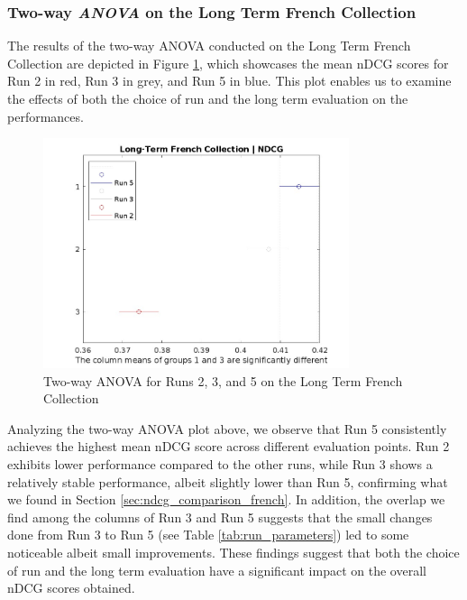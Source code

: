 \newpage
\enlargethispage{8\baselineskip}
\subsubsection{Two-way \textit{ANOVA} on the Long Term French Collection} \label{sec:anova_fr_lt}

The results of the two-way \ac{ANOVA} conducted on the Long Term French Collection are depicted in Figure \ref{fig:lt_anova_french}, which showcases the mean \ac{nDCG} scores for Run 2 in red, Run 3 in grey, and Run 5 in blue. 
This plot enables us to examine the effects of both the choice of run and the long term evaluation on the performances.

\begin{figure}[!h]
\centering
\includegraphics[width=0.8\textwidth]{figure/StatisticalAnalysis/ANOVA 2/ndcg-lt-fr.jpeg}
\caption{Two-way \ac{ANOVA} for Runs 2, 3, and 5 on the Long Term French Collection}
\label{fig:lt_anova_french}
\end{figure}

Analyzing the two-way \ac{ANOVA} plot above, we observe that Run 5 consistently achieves the highest mean \ac{nDCG} score across different evaluation points. 
Run 2 exhibits lower performance compared to the other runs, while Run 3 shows a relatively stable performance, albeit slightly lower than Run 5, confirming what we found in Section \ref{sec:ndcg_comparison_french}.
In addition, the overlap we find among the columns of Run 3 and Run 5 suggests that the small changes done from Run 3 to Run 5 (see Table \ref{tab:run_parameters}) led to some noticeable albeit small improvements. 
These findings suggest that both the choice of run and the long term evaluation have a significant impact on the overall \ac{nDCG} scores obtained.


